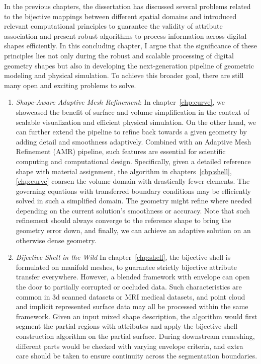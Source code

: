 In the previous chapters, the dissertation has discussed several problems related to the bijective mappings between different spatial domains and introduced relevant computational principles to guarantee the validity of attribute association and present robust algorithms to process information across digital shapes efficiently. 
In this concluding chapter, I argue that the significance of these principles lies not only during the robust and scalable processing of digital geometry shapes but also in developing the next-generation pipeline of geometric modeling and physical simulation. 
To achieve this broader goal, there are still many open and exciting problems to solve.

\begin{enumerate}
  \item \emph{Shape-Aware Adaptive Mesh Refinement}:
In chapter~\ref{chp:curve}, we showcased the benefit of surface and volume simplification in the context of scalable visualization and efficient physical simulation. 
On the other hand, we can further extend the pipeline to refine back towards a given geometry by adding detail and smoothness adaptively. Combined with an Adaptive Mesh Refinement (AMR) pipeline, such features are essential for scientific computing and computational design.
Specifically, given a detailed reference shape with material assignment, the algorithm in chapters~\ref{chp:shell},\ref{chp:curve} coarsen the volume domain with drastically fewer elements. 
The governing equations with transferred boundary conditions may be efficiently solved in such a simplified domain. The geometry might refine where needed depending on the current solution's smoothness or accuracy. 
Note that such refinement should always converge to the reference shape to bring the geometry error down, and finally, we can achieve an adaptive solution on an otherwise dense geometry. 

\item \emph{Bijective Shell in the Wild} %
In chapter~\ref{chp:shell}, the bijective shell is formulated on manifold meshes, 
to guarantee strictly bijective attribute transfer everywhere.
However, a blended framework with envelope \cite{hu2018tetrahedral, Wang:2021} can open the door to partially corrupted or occluded data. 
Such characteristics are common in 3d scanned datasets or MRI medical datasets, and point cloud and implicit represented surface data may all be processed within the same framework.
Given an input mixed shape description, the algorithm would first segment the partial regions with attributes and apply the bijective shell construction algorithm on the partial surface. During downstream remeshing, different parts would be checked with varying envelope criteria, and extra care should be taken to ensure continuity across the segmentation boundaries. 


\end{enumerate}
